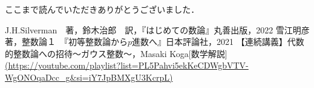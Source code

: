 \documentclass[dvipdfmx]{jsarticle}
\begin{document}
ここまで読んでいただきありがとうございました．


\begin{thebibliography}{9}
   J.H.Silverman　著，鈴木治郎　訳，『はじめての数論』丸善出版，2022
  雪江明彦　著，整数論１　『初等整数論から$p$進数へ』日本評論社，2021
   【連続講義】代数的整数論への招待〜ガウス整数〜，Masaki Koga[数学解説]\url{(https://youtube.com/playlist?list=PL5Pahvi5ekKeCDWgbVTV-WgONOqaDcc_g&si=iY7JpBMXgU3KcrpL)}
\end{thebibliography}
\end{document}
